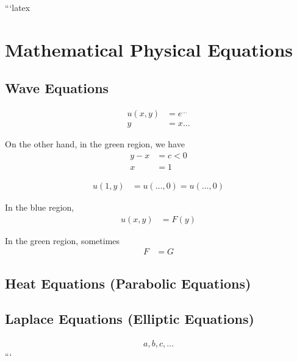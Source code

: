 ```latex
\section*{Mathematical Physical Equations}

\subsection*{Wave Equations}

\begin{align*}
    u(x, y) &= e^{\ldots} \\
    y &= x \ldots
\end{align*}

On the other hand, in the green region, we have
\begin{align*}
    y - x &= c < 0 \\
    x &= 1
\end{align*}

\begin{align*}
    u(1, y) &= u(\ldots, 0) = u(\ldots, 0)
\end{align*}

In the blue region,
\begin{align*}
    u(x, y) &= F(y)
\end{align*}

In the green region, sometimes
\begin{align*}
    F &= G
\end{align*}

\subsection*{Heat Equations (Parabolic Equations)}

\subsection*{Laplace Equations (Elliptic Equations)}

\begin{align*}
    a, b, c, \ldots
\end{align*}
```
